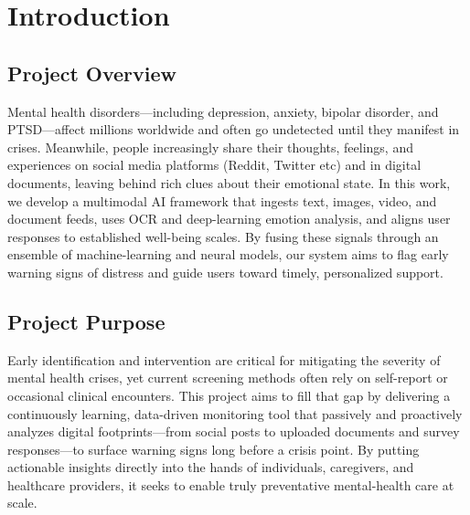 
\vspace{2cm}

\section{Introduction}

\begin{comment}
    Briefly introduce the project's overall topic and purpose.
    \vspace{.1in}
    
    \noindent
    Provide specifications of Technical domain (Hardware, Operating System, Software) and Business domain.
    \vspace{.1in}
    
    \noindent
    Provide \textbf{Glossary} / Keywords in a tabular format.
\end{comment}


\subsection{Project Overview}
\noindent
Mental health disorders—including depression, anxiety, bipolar disorder, and PTSD—affect millions worldwide and often go undetected until they manifest in crises. Meanwhile, people increasingly share their thoughts, feelings, and experiences on social media platforms (Reddit, Twitter etc) and in digital documents, leaving behind rich clues about their emotional state. In this work, we develop a multimodal AI framework that ingests text, images, video, and document feeds, uses OCR and deep-learning emotion analysis, and aligns user responses to established well-being scales. By fusing these signals through an ensemble of machine-learning and neural models, our system aims to flag early warning signs of distress and guide users toward timely, personalized support.

\subsection{Project Purpose}
\noindent
Early identification and intervention are critical for mitigating the severity of mental health crises, yet current screening methods often rely on self-report or occasional clinical encounters. This project aims to fill that gap by delivering a continuously learning, data-driven monitoring tool that passively and proactively analyzes digital footprints—from social posts to uploaded documents and survey responses—to surface warning signs long before a crisis point. By putting actionable insights directly into the hands of individuals, caregivers, and healthcare providers, it seeks to enable truly preventative mental-health care at scale.

